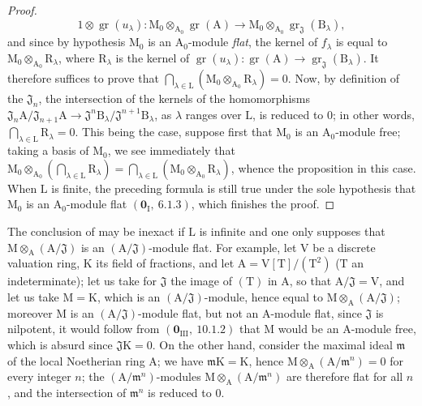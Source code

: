 \begin{proof}
\[
1\otimes\operatorname{gr}(u_\lambda) : \mathrm{M}_0\otimes_{\mathrm{A}_0}\operatorname{gr}(\mathrm{A}) \to \mathrm{M}_0\otimes_{\mathrm{A}_0}\operatorname{gr}_\mathfrak{J}(\mathrm{B}_\lambda),
\]
and since by hypothesis $\mathrm{M}_0$ is an $\mathrm{A}_0$-module \emph{flat}, the kernel of $f_\lambda$ is equal to $\mathrm{M}_0\otimes_{\mathrm{A}_0}\mathrm{R}_\lambda$,
where $\mathrm{R}_\lambda$ is the kernel of $\operatorname{gr}(u_\lambda):\operatorname{gr}(\mathrm{A})\to\operatorname{gr}_\mathfrak{J}(\mathrm{B}_\lambda)$. It therefore suffices to prove that
$\bigcap_{\lambda\in\mathrm{L}}(\mathrm{M}_0\otimes_{\mathrm{A}_0}\mathrm{R}_\lambda)=0$. Now, by definition of the $\mathfrak{J}_n$, the intersection of the kernels of the homomorphisms
$\mathfrak{J}_n\mathrm{A}/\mathfrak{J}_{n+1}\mathrm{A}\to\mathfrak{J}^n\mathrm{B}_\lambda/\mathfrak{J}^{n+1}\mathrm{B}_\lambda$, as $\lambda$ ranges over $\mathrm{L}$, is reduced to $0$; in other
words, $\bigcap_{\lambda\in\mathrm{L}}\mathrm{R}_\lambda=0$. This being the case, suppose first that $\mathrm{M}_0$ is an $\mathrm{A}_0$-module free; taking
a basis of $\mathrm{M}_0$, we see immediately that $\mathrm{M}_0\otimes_{\mathrm{A}_0}(\bigcap_{\lambda\in\mathrm{L}}\mathrm{R}_\lambda)=\bigcap_{\lambda\in\mathrm{L}}(\mathrm{M}_0\otimes_{\mathrm{A}_0}\mathrm{R}_\lambda)$, whence the
proposition in this case. When $\mathrm{L}$ is finite, the preceding formula is still true under
the sole hypothesis that $\mathrm{M}_0$ is an $\mathrm{A}_0$-module flat $(\mathbf{0}_\mathrm{I},~6.1.3)$, which finishes the
proof.
\end{proof}

\begin{remark}[11.4.2]
\label{IV.11.4.2}
The conclusion of  may be inexact if $\mathrm{L}$ is infinite
and one only supposes that $\mathrm{M}\otimes_\mathrm{A}(\mathrm{A}/\mathfrak{J})$ is an $(\mathrm{A}/\mathfrak{J})$-module flat. For example,
let $\mathrm{V}$ be a discrete valuation ring, $\mathrm{K}$ its field of fractions, and let $\mathrm{A}=\mathrm{V}[\mathrm{T}]/(\mathrm{T}^2)$
($\mathrm{T}$ an indeterminate); let us take for $\mathfrak{J}$ the image of $(\mathrm{T})$ in $\mathrm{A}$, so that $\mathrm{A}/\mathfrak{J}=\mathrm{V}$, and
let us take $\mathrm{M}=\mathrm{K}$, which is an $(\mathrm{A}/\mathfrak{J})$-module, hence equal to $\mathrm{M}\otimes_\mathrm{A}(\mathrm{A}/\mathfrak{J})$; moreover $\mathrm{M}$ is
an $(\mathrm{A}/\mathfrak{J})$-module flat, but not an $\mathrm{A}$-module flat, since $\mathfrak{J}$ is nilpotent, it
would follow from $(\mathbf{0}_{\mathrm{III}},~10.1.2)$ that $\mathrm{M}$ would be an $\mathrm{A}$-module free, which is absurd
since $\mathfrak{J}\mathrm{K}=0$. On the other hand, consider the maximal ideal $\mathfrak{m}$ of the local Noetherian
ring $\mathrm{A}$; we have $\mathfrak{m}\mathrm{K}=\mathrm{K}$, hence $\mathrm{M}\otimes_\mathrm{A}(\mathrm{A}/\mathfrak{m}^n)=0$ for every integer $n$; the $(\mathrm{A}/\mathfrak{m}^n)$-modules
$\mathrm{M}\otimes_\mathrm{A}(\mathrm{A}/\mathfrak{m}^n)$ are therefore flat for all $n$, and the intersection of $\mathfrak{m}^n$ is reduced to $0$.
\end{remark}

